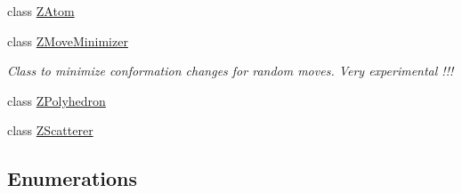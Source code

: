 \begin{DoxyCompactItemize}
class \mbox{\hyperlink{class_obj_cryst_1_1_z_atom}{Z\+Atom}}
\item 
class \mbox{\hyperlink{class_obj_cryst_1_1_z_move_minimizer}{Z\+Move\+Minimizer}}
\begin{DoxyCompactList}\small\item\em Class to minimize conformation changes for random moves. Very experimental !!! \end{DoxyCompactList}\item 
class \mbox{\hyperlink{class_obj_cryst_1_1_z_polyhedron}{Z\+Polyhedron}}
\item 
class \mbox{\hyperlink{class_obj_cryst_1_1_z_scatterer}{Z\+Scatterer}}
\end{DoxyCompactItemize}
\subsection*{Enumerations}
